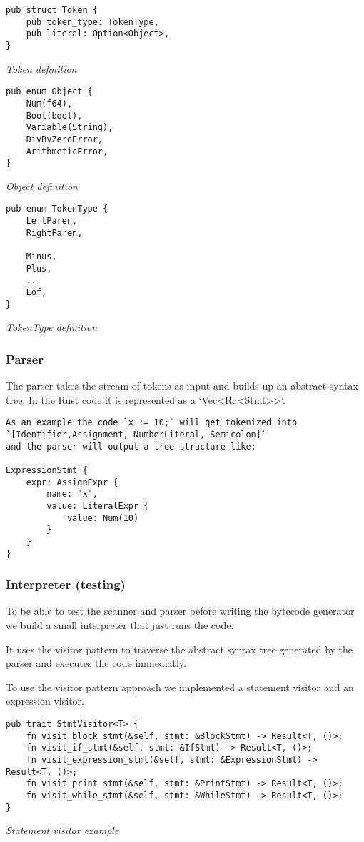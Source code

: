 \documentclass{article}
\begin{document}
\begin{verbatim}
pub struct Token {
    pub token_type: TokenType,
    pub literal: Option<Object>,
}
\end{verbatim}
\textit{Token definition}

\begin{verbatim}
pub enum Object {
    Num(f64),
    Bool(bool),
    Variable(String),
    DivByZeroError,
    ArithmeticError,
}
\end{verbatim}
\textit{Object definition}

\begin{verbatim}
pub enum TokenType {
    LeftParen,
    RightParen,

    Minus,
    Plus,
    ...
    Eof,
}
\end{verbatim}
\textit{TokenType definition}

\subsubsection{Parser}
The parser takes the stream of tokens as input and builds up an abstract syntax
tree. In the Rust code it is represented as a `Vec<Rc<Stmt>>`.

\begin{verbatim}
As an example the code `x := 10;` will get tokenized into 
`[Identifier,Assignment, NumberLiteral, Semicolon]` 
and the parser will output a tree structure like:

ExpressionStmt {
    expr: AssignExpr {
        name: "x",
        value: LiteralExpr {
            value: Num(10)
        }
    }
}
\end{verbatim}


\subsubsection{Interpreter (testing)}
To be able to test the scanner and parser before writing the bytecode generator
we build a small interpreter that just runs the code.

It uses the visitor pattern to traverse the abstract syntax tree generated by
the parser and executes the code immediatly.

To use the visitor pattern approach we implemented a statement visitor and an
expression visitor.

\begin{verbatim}
pub trait StmtVisitor<T> {
    fn visit_block_stmt(&self, stmt: &BlockStmt) -> Result<T, ()>;
    fn visit_if_stmt(&self, stmt: &IfStmt) -> Result<T, ()>;
    fn visit_expression_stmt(&self, stmt: &ExpressionStmt) -> Result<T, ()>;
    fn visit_print_stmt(&self, stmt: &PrintStmt) -> Result<T, ()>;
    fn visit_while_stmt(&self, stmt: &WhileStmt) -> Result<T, ()>;
}
\end{verbatim}
\textit{Statement visitor example}
\end{document}
